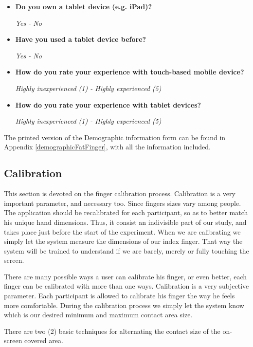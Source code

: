 \begin{itemize}
	\item \textbf{Do you own a tablet device (e.g. iPad)?}

	\emph{Yes - No}
	\item \textbf{Have you used a tablet device before?}
	
	\emph{Yes - No}
	\item \textbf{How do you rate your experience with touch-based mobile device?}

	\emph{Highly inexperienced (1) - Highly experienced (5)}
	\item \textbf{How do you rate your experience with tablet devices?}

	\emph{Highly inexperienced (1) - Highly experienced (5)}
\end{itemize}


The printed version of the Demographic information form can be found in Appendix \ref{demographicFatFinger}, with all the information included. 




\subsection{Calibration}

This section is devoted on the finger calibration process. Calibration is a very important parameter, and necessary too. Since fingers sizes vary among people. The application should be recalibrated for each participant, so as to better match his unique hand dimensions. Thus, it consist an indivisible part of our study, and takes place just before the start of the experiment. When we are calibrating we simply let the system measure the dimensions of our index finger. That way the system will be trained to understand if we are barely, merely or fully touching the screen.

There are many possible ways a user can calibrate his finger, or even better, each finger can be calibrated with more than one ways. Calibration is a very subjective parameter. Each participant is allowed to calibrate his finger the way he feels more comfortable. During the calibration process we simply let the system know which is our desired minimum and maximum contact area size. 


There are two (2)  basic techniques for alternating the contact size of the on-screen covered area.

